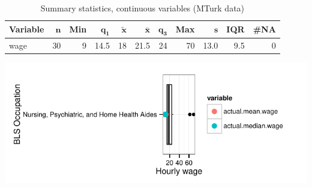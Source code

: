 \documentclass[a4paper,10pt]{article}\usepackage[]{graphicx}\usepackage[]{color}
\makeatletter
\def\maxwidth{ %
  \ifdim\Gin@nat@width>\linewidth
    \linewidth
  \else
    \Gin@nat@width
  \fi
}
\makeatother
\begin{document}
\begin{table}[ht]
\centering
{\footnotesize
\begin{tabular}{lrrrrrrrrrr}
 \textbf{Variable} & $\mathbf{n}$ & \textbf{Min} & $\mathbf{q_1}$ & $\mathbf{\widetilde{x}}$ & $\mathbf{\bar{x}}$ & $\mathbf{q_3}$ & \textbf{Max} & $\mathbf{s}$ & \textbf{IQR} & \textbf{\#NA} \\ 
  \hline
wage & 30 & 9 & 14.5 & 18 & 21.5 & 24 & 70 & 13.0 & 9.5 & 0 \\ 
  \end{tabular}
}
\caption{Summary statistics, continuous variables (MTurk data)} 
\label{tab2:31-1010}
\end{table}


{\centering \includegraphics[width=\maxwidth]{figure/unnamed-chunk-210} 

}
\end{document}
